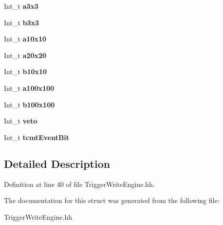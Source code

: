 \begin{DoxyCompactItemize}
\item 
Int\_\-t {\bfseries a3x3}\label{structmarlin_1_1TriggerWriteEngine_1_1TrigBits__t_a0f9465a7d5475ec1134cb147789b1365}

\item 
Int\_\-t {\bfseries b3x3}\label{structmarlin_1_1TriggerWriteEngine_1_1TrigBits__t_a8a0b9ea0bd5f9934e81dd1d467dd6906}

\item 
Int\_\-t {\bfseries a10x10}\label{structmarlin_1_1TriggerWriteEngine_1_1TrigBits__t_a45f03aca2a1e0cc9b0051a248b22822e}

\item 
Int\_\-t {\bfseries a20x20}\label{structmarlin_1_1TriggerWriteEngine_1_1TrigBits__t_ad90f74da3bef681a58a9281e2de6f7c6}

\item 
Int\_\-t {\bfseries b10x10}\label{structmarlin_1_1TriggerWriteEngine_1_1TrigBits__t_a769d73a2418b9152aed657d4f20aa212}

\item 
Int\_\-t {\bfseries a100x100}\label{structmarlin_1_1TriggerWriteEngine_1_1TrigBits__t_ad8b904c8090e72866c6519293342d354}

\item 
Int\_\-t {\bfseries b100x100}\label{structmarlin_1_1TriggerWriteEngine_1_1TrigBits__t_a4d9d064d62b762665ef14923b28426ed}

\item 
Int\_\-t {\bfseries veto}\label{structmarlin_1_1TriggerWriteEngine_1_1TrigBits__t_ac26914098e75362f8c486f9e98f12d01}

\item 
Int\_\-t {\bfseries tcmtEventBit}\label{structmarlin_1_1TriggerWriteEngine_1_1TrigBits__t_ad0e09a40117811e97a00221376019fa9}

\end{DoxyCompactItemize}


\subsection{Detailed Description}


Definition at line 40 of file TriggerWriteEngine.hh.

The documentation for this struct was generated from the following file:\begin{DoxyCompactItemize}
\item 
TriggerWriteEngine.hh\end{DoxyCompactItemize}
